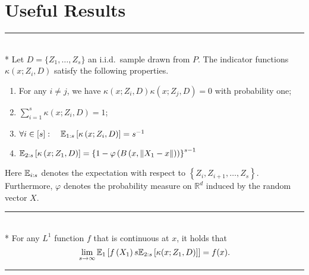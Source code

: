 \section{Useful Results}
\hrule

\begin{lem}\label{lem:dem12}\mbox{}\\*
	Let $D = \{Z_1, \dotsc, Z_s\}$ an i.i.d.\ sample drawn from $P$.
	The indicator functions $\kappa\left(x; Z_{i}, D\right)$ satisfy the following properties.
	\begin{enumerate}
		\item For any $i \neq j$, we have $\kappa\left(x; Z_{i}, D\right) \kappa\left(x; Z_{j}, D\right)=0$ with probability one;
		\item $\sum_{i=1}^{s} \kappa\left(x; Z_{i}, D\right)=1$;
		\item $\forall i \in [s]: \quad \mathbb{E}_{1:s}\left[\kappa\left(x; Z_{i}, D\right)\right]=s^{-1}$
		\item $\mathbb{E}_{2: s}\left[\kappa\left(x; Z_1, D\right)\right]=\left\{1-\varphi\left(B\left(x,\left\|X_1-x\right\|\right)\right)\right\}^{s-1}$
	\end{enumerate}
	Here $\mathbb{E}_{i: s}$ denotes the expectation with respect to $\left\{Z_{i}, Z_{i+1}, \dotsc, Z_s\right\}$.
	Furthermore, $\varphi$ denotes the probability measure on $\mathbb{R}^{d}$ induced by the random vector $X$.
\end{lem}

\hrule

\begin{lem}\label{lem:dem13}\mbox{}\\*
	For any $L^1$ function $f$ that is continuous at $x$, it holds that
	\begin{equation}
		\lim _{s \rightarrow \infty} \mathbb{E}_{1}\left[f\left(X_1\right) s \mathbb{E}_{2:s}\left[\kappa(x; Z_1, D)\right]\right]
		= f(x).
	\end{equation}
\end{lem}

\hrule

